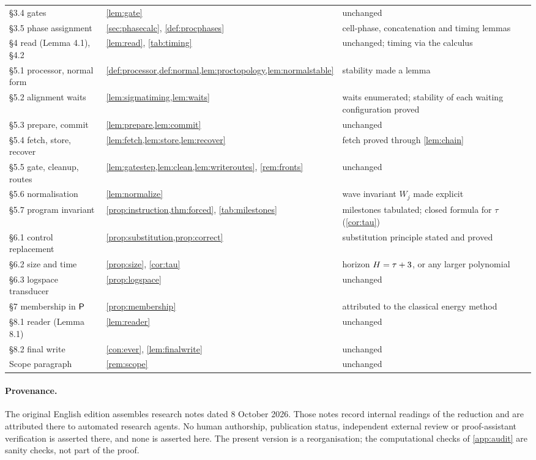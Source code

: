 \begin{center}
\begin{longtable}{p{4.6cm}p{4.6cm}p{5.2cm}}
\S3.4 gates & \cref{lem:gate} & unchanged\\
\S3.5 phase assignment & \cref{sec:phasecalc}, \cref{def:procphases} & cell-phase, concatenation and timing lemmas\\
\S4 read (Lemma 4.1), \S4.2 & \cref{lem:read}, \cref{tab:timing} & unchanged; timing via the calculus\\
\S5.1 processor, normal form & \cref{def:processor,def:normal,lem:proctopology,lem:normalstable} & stability made a lemma\\
\S5.2 alignment waits & \cref{lem:sigmatiming,lem:waits} & waits enumerated; stability of each waiting configuration proved\\
\S5.3 prepare, commit & \cref{lem:prepare,lem:commit} & unchanged\\
\S5.4 fetch, store, recover & \cref{lem:fetch,lem:store,lem:recover} & fetch proved through \cref{lem:chain}\\
\S5.5 gate, cleanup, routes & \cref{lem:gatestep,lem:clean,lem:writeroutes}, \cref{rem:fronts} & unchanged\\
\S5.6 normalisation & \cref{lem:normalize} & wave invariant $W_j$ made explicit\\
\S5.7 program invariant & \cref{prop:instruction,thm:forced}, \cref{tab:milestones} & milestones tabulated; closed formula for $\tau$ (\cref{cor:tau})\\
\S6.1 control replacement & \cref{prop:substitution,prop:correct} & substitution principle stated and proved\\
\S6.2 size and time & \cref{prop:size}, \cref{cor:tau} & horizon $H=\tau+3$, or any larger polynomial\\
\S6.3 logspace transducer & \cref{prop:logspace} & unchanged\\
\S7 membership in $\mathsf{P}$ & \cref{prop:membership} & attributed to the classical energy method\\
\S8.1 reader (Lemma 8.1) & \cref{lem:reader} & unchanged\\
\S8.2 final write & \cref{con:ever}, \cref{lem:finalwrite} & unchanged\\
Scope paragraph & \cref{rem:scope} & unchanged\\\bottomrule
\end{longtable}
\end{center}

\paragraph{Provenance.} The original English edition assembles research notes dated 8 October
2026. Those notes record internal readings of the reduction and are attributed there to automated
research agents. No human authorship, publication status, independent external review or
proof-assistant verification is asserted there, and none is asserted here. The present version is a
reorganisation; the computational checks of \cref{app:audit} are sanity checks, not part of the
proof.

